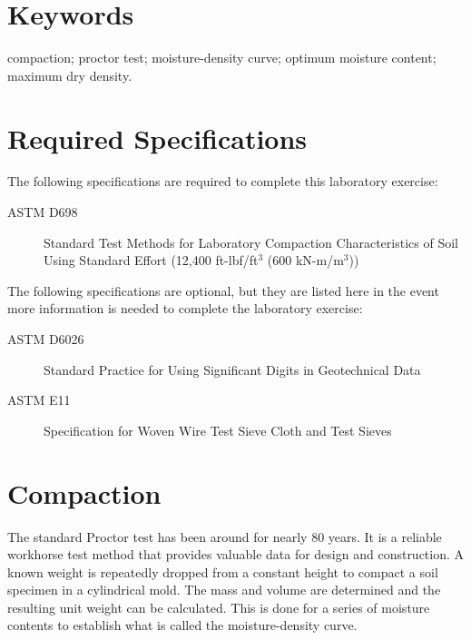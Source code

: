 \documentclass[12pt]{article}
\begin{document}
\vfill
\section*{Keywords}
\normalsize compaction; proctor test; moisture-density curve; optimum moisture content; maximum dry density.\\
\pagebreak
\begin{center}
\tableofcontents
\pagebreak
\listoftables
\listoffigures
\end{center}
\pagebreak
\section*{Required Specifications}
The following specifications are required to complete this laboratory exercise:
\begin{description}
\item[ASTM D698] Standard Test Methods for Laboratory Compaction Characteristics of Soil Using Standard Effort (12,400 ft-lbf/ft$^3$ (600 kN-m/m$^3$))
\end{description}

The following specifications are optional, but they are listed here in the event more information is needed to complete the laboratory exercise:
\begin{description}
\item[ASTM D6026] Standard Practice for Using Significant Digits in Geotechnical Data
\item[ASTM E11] Specification for Woven Wire Test Sieve Cloth and Test Sieves
\end{description}
\pagebreak
\section{Compaction}
\label{sec:intro}
\normalsize 
The standard Proctor test has been around for nearly 80 years. It is a reliable workhorse test method that provides valuable data for design and construction. A known weight is repeatedly dropped from a constant height to compact a soil specimen in a cylindrical mold. The mass and volume are determined and the resulting unit weight can be calculated. This is done for a series of moisture contents to establish what is called the moisture-density curve.
\end{document}
